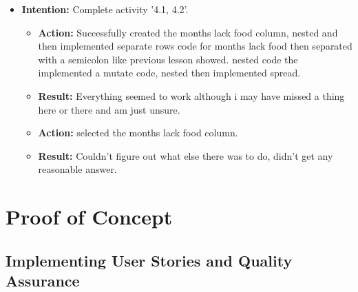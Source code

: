 \documentclass{article}
\begin{document}
\begin{itemize}
\begin{itemize}
\end{itemize}

\item{\textbf{Intention:} Complete activity '4.1, 4.2'.}

\begin{itemize}
\item{\textbf{Action:} Successfully created the months lack food column, nested and then implemented separate rows code for months lack food then separated with a semicolon like previous lesson showed. nested code the implemented a mutate code, nested then implemented spread.}
\item{\textbf{Result:} Everything seemed to work although i may have missed a thing here or there and am just unsure.}

\item{\textbf{Action:} selected the months lack food column.}
\item{\textbf{Result:} Couldn't figure out what else there was to do, didn't get any reasonable answer.}


\end{itemize}




 
\end{itemize}

\section{Proof of Concept}

\subsection{Implementing User Stories and Quality Assurance}
\end{document}
